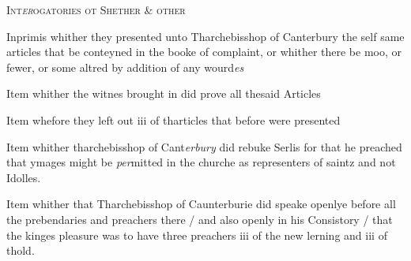 \documentclass[12pt, a4paper]{book}
\begin{document}
				\begin{center} \begin{large} {\scshape Int\textit{er}ogatories ot Shether \& other} \end{large} \end{center}
			

		
				\marginpar[\vspace{0.5cm}{\textcolor{Gray}{1}}]{}
			
            		
		\ifthenelse{\isodd{\thepage}}
		{\reversemarginpar}
		{\normalmarginpar}
		Inprimis whither they presented unto Tharchebisshop  of Canterbury the
self same articles that be conteyned in the booke of complaint, or whither
there be moo, or fewer, or some altred by addition of any wourd\textit{es}

				\marginpar[\vspace{0.5cm}{\textcolor{Gray}{2}}]{}
			
		\ifthenelse{\isodd{\thepage}}
		{\reversemarginpar}
		{\normalmarginpar}
		Item whither the witnes brought in did prove all thesaid Articles
            		
	
				\marginpar[\vspace{0.5cm}{\textcolor{Gray}{3}}]{}
			
		\ifthenelse{\isodd{\thepage}}
		{\reversemarginpar}
		{\normalmarginpar}
		Item whefore they left out iii of tharticles that before were presented
			
            		
	
				\marginpar[\vspace{0.5cm}{\textcolor{Gray}{4}}]{}
			
		\ifthenelse{\isodd{\thepage}}
		{\reversemarginpar}
		{\normalmarginpar}
		Item whither tharchebisshop  of Cant\textit{erbury} did rebuke Serlis for that he
preached that ymages might be\textit{ per}mitted in the churche as representers
of saintz and not Idolles.
            		
				\marginpar[\vspace{0.5cm}{\textcolor{Gray}{5}}]{}
			
		\ifthenelse{\isodd{\thepage}}
		{\reversemarginpar}
		{\normalmarginpar}
		Item whither that Tharchebisshop  of Caunterburie did speake openlye
before all the prebendaries and preachers there / and also openly in his 
Consistory / that the kinges pleasure was to have three preachers 
iii of the new lerning and iii of thold.
            		
\end{document}
